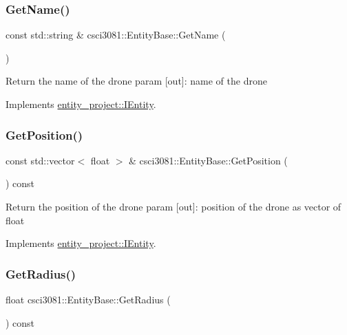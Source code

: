 \subsubsection{\texorpdfstring{Get\+Name()}{GetName()}}
{\footnotesize\ttfamily const std\+::string \& csci3081\+::\+Entity\+Base\+::\+Get\+Name (\begin{DoxyParamCaption}{ }\end{DoxyParamCaption})\hspace{0.3cm}{\ttfamily [virtual]}}

Return the name of the drone param \mbox{[}out\mbox{]}\+: name of the drone 

Implements \hyperlink{classentity__project_1_1IEntity_a60fe17f543af26a48181a0c290a822ab}{entity\+\_\+project\+::\+I\+Entity}.

\mbox{\label{classcsci3081_1_1EntityBase_a05830db8b41c0a9c05eec08f95f683ad}} 
\subsubsection{\texorpdfstring{Get\+Position()}{GetPosition()}}
{\footnotesize\ttfamily const std\+::vector$<$ float $>$ \& csci3081\+::\+Entity\+Base\+::\+Get\+Position (\begin{DoxyParamCaption}{ }\end{DoxyParamCaption}) const\hspace{0.3cm}{\ttfamily [virtual]}}

Return the position of the drone param \mbox{[}out\mbox{]}\+: position of the drone as vector of float 

Implements \hyperlink{classentity__project_1_1IEntity_a1369c59d258645a12a06239ece1134cf}{entity\+\_\+project\+::\+I\+Entity}.

\mbox{\label{classcsci3081_1_1EntityBase_abf61eb1cc8b94a7756f0ebc6a0c8a8f3}} 
\subsubsection{\texorpdfstring{Get\+Radius()}{GetRadius()}}
{\footnotesize\ttfamily float csci3081\+::\+Entity\+Base\+::\+Get\+Radius (\begin{DoxyParamCaption}{ }\end{DoxyParamCaption}) const\hspace{0.3cm}{\ttfamily [virtual]}}

